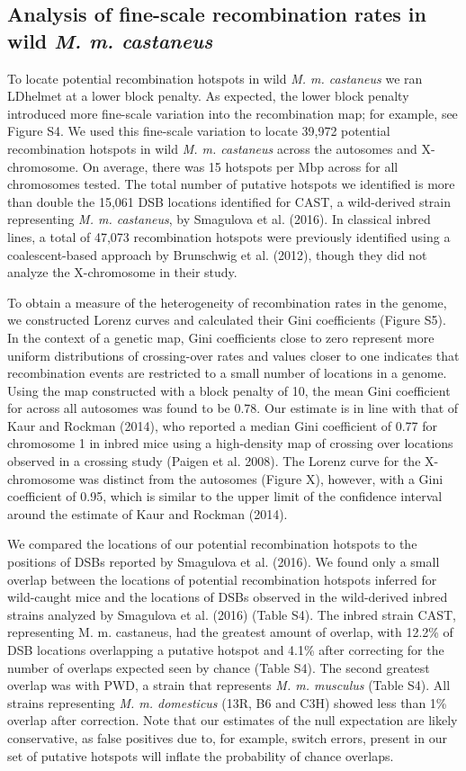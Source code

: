 \subsection{Analysis of fine-scale recombination rates in wild \emph{M. m. castaneus}}


To locate potential recombination hotspots in wild \textit{M. m. castaneus} we ran LDhelmet at a lower block penalty. As expected, the lower block penalty introduced more fine-scale variation into the recombination map; for example, see Figure S4. We used this fine-scale variation to locate 39,972 potential recombination hotspots in wild \textit{M. m. castaneus} across the autosomes and X-chromosome. On average, there was 15 hotspots per Mbp across for all chromosomes tested. The total number of putative hotspots we identified is more than double the 15,061 DSB locations identified for CAST, a wild-derived strain representing \textit{M. m. castaneus}, by Smagulova et al. (2016). In classical inbred lines, a total of 47,073 recombination hotspots were previously identified using a coalescent-based approach by Brunschwig et al. (2012), though they did not analyze the X-chromosome in their study. 

To obtain a measure of the heterogeneity of recombination rates in the genome, we constructed Lorenz curves and calculated their Gini coefficients (Figure S5). In the context of a genetic map, Gini coefficients close to zero represent more uniform distributions of crossing-over rates and values closer to one indicates that recombination events are restricted to a small number of locations in a genome. Using the map constructed with a block penalty of 10, the mean Gini coefficient for across all autosomes was found to be 0.78. Our estimate is in line with that of Kaur and Rockman (2014), who reported a median Gini coefficient of 0.77 for chromosome 1 in inbred mice using a high-density map of crossing over locations observed in a crossing study (Paigen et al. 2008). The Lorenz curve for the X-chromosome was distinct from the autosomes (Figure X), however, with a Gini coefficient of 0.95, which is similar to the upper limit of the confidence interval around the estimate of Kaur and Rockman (2014). 

We compared the locations of our potential recombination hotspots to the positions of DSBs reported by Smagulova et al. (2016). We found only a small overlap between the locations of potential recombination hotspots inferred for wild-caught mice and the locations of DSBs observed in the wild-derived inbred strains analyzed by Smagulova et al. (2016) (Table S4). The inbred strain CAST, representing M. m. castaneus, had the greatest amount of overlap, with 12.2\% of DSB locations overlapping a putative hotspot and 4.1\% after correcting for the number of overlaps expected seen by chance (Table S4). The second greatest overlap was with PWD, a strain that represents \emph{M. m. musculus} (Table S4). All strains representing \emph{M. m. domesticus} (13R, B6 and C3H) showed less than 1\% overlap after correction. Note that our estimates of the null expectation are likely conservative, as false positives due to, for example, switch errors, present in our set of putative hotspots will inflate the probability of chance overlaps. 

